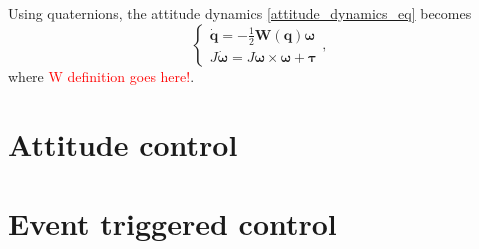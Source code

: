 	 Using quaternions, the attitude dynamics \eqref{attitude_dynamics_eq} becomes
	 \begin{equation}
	 	\left \{\begin{array}{l}
		 	\mathbf{\dot q} = \displaystyle -\frac{1}{2} \mathbf{W(q)} \boldsymbol \omega\\
		 	J \boldsymbol{ \dot \omega }= J \boldsymbol \omega \times \boldsymbol \omega + \boldsymbol \tau
		 \end{array} \right . ,
		 \label{quaternion_dynamics}
	\end{equation}
	where \textcolor{red}{W definition goes here!}.
\section{Attitude control}
\section{Event triggered control}

